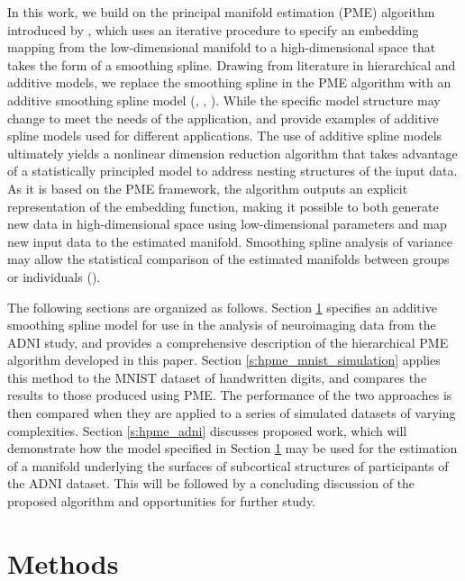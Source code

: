 \documentclass[11pt,reqno]{article}
\theoremstyle{definition}
\begin{document}
In this work, we build on the principal manifold estimation (PME) algorithm introduced by \cite{mengPrincipalManifoldEstimation2021}, which uses an iterative procedure to specify an embedding mapping from the low-dimensional manifold to a high-dimensional space that takes the form of a smoothing spline. Drawing from literature in hierarchical and additive models, we replace the smoothing spline in the PME algorithm with an additive smoothing spline model (\cite{gelmanDataAnalysisUsing2007}, \cite{hastieGeneralizedAdditiveModels1990}, \cite{gelmanBayesianDataAnalysis2014}). While the specific model structure may change to meet the needs of the application, \cite{brumbackSmoothingSplineModels1998} and \cite{schulamFrameworkIndividualizingPredictions2015a} provide examples of additive spline models used for different applications. The use of additive spline models ultimately yields a nonlinear dimension reduction algorithm that takes advantage of a statistically principled model to address nesting structures of the input data. As it is based on the PME framework, the algorithm outputs an explicit representation of the embedding function, making it possible to both generate new data in high-dimensional space using low-dimensional parameters and map new input data to the estimated manifold. Smoothing spline analysis of variance may allow the statistical comparison of the estimated manifolds between groups or individuals (\cite{wangMixedEffectsSmoothing1998}).

The following sections are organized as follows. Section \ref{s:methods} specifies an additive smoothing spline model for use in the analysis of neuroimaging data from the ADNI study, and provides a comprehensive description of the hierarchical PME algorithm developed in this paper. Section \ref{s:hpme_mnist_simulation} applies this method to the MNIST dataset of handwritten digits, and compares the results to those produced using PME. The performance of the two approaches is then compared when they are applied to a series of simulated datasets of varying complexities. Section \ref{s:hpme_adni} discusses proposed work, which will demonstrate how the model specified in Section \ref{s:methods} may be used for the estimation of a manifold underlying the surfaces of subcortical structures of participants of the ADNI dataset. This will be followed by a concluding discussion of the proposed algorithm and opportunities for further study.

\section{Methods}\label{s:methods}
\end{document}
